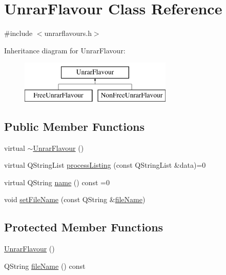 \hypertarget{classUnrarFlavour}{\section{Unrar\+Flavour Class Reference}
\label{classUnrarFlavour}
}


{\ttfamily \#include $<$unrarflavours.\+h$>$}

Inheritance diagram for Unrar\+Flavour\+:\begin{figure}[H]
\begin{center}
\leavevmode
\includegraphics[height=2.000000cm]{classUnrarFlavour}
\end{center}
\end{figure}
\subsection*{Public Member Functions}
\begin{DoxyCompactItemize}
\item 
virtual \hyperlink{classUnrarFlavour_a28b13e46abb1bb385edbc9ac2a59f5a7}{$\sim$\+Unrar\+Flavour} ()
\item 
virtual Q\+String\+List \hyperlink{classUnrarFlavour_a1c84a80c8f20796dd4b3a2c9ebe96882}{process\+Listing} (const Q\+String\+List \&data)=0
\item 
virtual Q\+String \hyperlink{classUnrarFlavour_a96716e71ee74d815c81252ccd750be16}{name} () const =0
\item 
void \hyperlink{classUnrarFlavour_a11b43564329c371b549a538bb989b654}{set\+File\+Name} (const Q\+String \&\hyperlink{classUnrarFlavour_abe2a9523ecbde6497df9d1e82a40c038}{file\+Name})
\end{DoxyCompactItemize}
\subsection*{Protected Member Functions}
\begin{DoxyCompactItemize}
\item 
\hyperlink{classUnrarFlavour_a3059a7173d07cebb28ca3215a6332fdb}{Unrar\+Flavour} ()
\item 
Q\+String \hyperlink{classUnrarFlavour_abe2a9523ecbde6497df9d1e82a40c038}{file\+Name} () const 
\end{DoxyCompactItemize}


